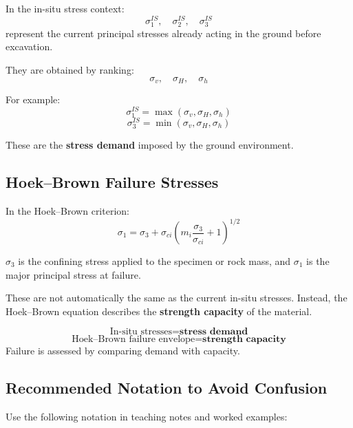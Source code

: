 \documentclass[a4paper,12pt]{article}
\begin{document}
In the in-situ stress context:
\[
\sigma_1^{IS},\quad \sigma_2^{IS},\quad \sigma_3^{IS}
\]
represent the current principal stresses already acting in the ground before excavation.

They are obtained by ranking:
\[
\sigma_v,\quad \sigma_H,\quad \sigma_h
\]

For example:
\[
\sigma_1^{IS} = \max(\sigma_v,\sigma_H,\sigma_h)
\]
\[
\sigma_3^{IS} = \min(\sigma_v,\sigma_H,\sigma_h)
\]

These are the \textbf{stress demand} imposed by the ground environment.

\subsection{Hoek--Brown Failure Stresses}

In the Hoek--Brown criterion:
\[
\sigma_1 =
\sigma_3 + \sigma_{ci}
\left(
m_i\frac{\sigma_3}{\sigma_{ci}} + 1
\right)^{1/2}
\]

\(\sigma_3\) is the confining stress applied to the specimen or rock mass, and
\(\sigma_1\) is the major principal stress at failure.

These are not automatically the same as the current in-situ stresses. Instead, the
Hoek--Brown equation describes the \textbf{strength capacity} of the material.

\begin{keybox}
\[
\text{In-situ stresses} = \textbf{stress demand}
\]
\[
\text{Hoek--Brown failure envelope} = \textbf{strength capacity}
\]
Failure is assessed by comparing demand with capacity.
\end{keybox}

\subsection{Recommended Notation to Avoid Confusion}

Use the following notation in teaching notes and worked examples:
\end{document}
